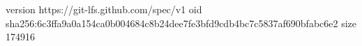 version https://git-lfs.github.com/spec/v1
oid sha256:6c3ffa9a0a154ca0b004684c8b24dee7fe3bfd9cdb4bc7c5837af690bfabc6e2
size 174916
